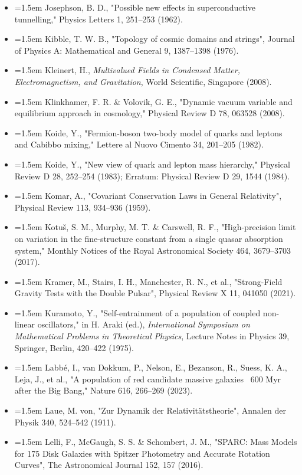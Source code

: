 \documentclass[11pt,a4paper]{article}
\begin{document}
\begin{itemize}[leftmargin=1.5em,label={}]
\item \hangindent=1.5em Josephson, B. D., "Possible new effects in superconductive tunnelling," Physics Letters 1, 251–253 (1962).
\item \hangindent=1.5em Kibble, T. W. B., "Topology of cosmic domains and strings", Journal of Physics A: Mathematical and General 9, 1387–1398 (1976).
\item \hangindent=1.5em Kleinert, H., \emph{Multivalued Fields in Condensed Matter, Electromagnetism, and Gravitation}, World Scientific, Singapore (2008).
\item \hangindent=1.5em Klinkhamer, F. R. \& Volovik, G. E., "Dynamic vacuum variable and equilibrium approach in cosmology," Physical Review D 78, 063528 (2008).
\item \hangindent=1.5em Koide, Y., "Fermion-boson two-body model of quarks and leptons and Cabibbo mixing," Lettere al Nuovo Cimento 34, 201–205 (1982).
\item \hangindent=1.5em Koide, Y., "New view of quark and lepton mass hierarchy," Physical Review D 28, 252–254 (1983); Erratum: Physical Review D 29, 1544 (1984).
\item \hangindent=1.5em Komar, A., "Covariant Conservation Laws in General Relativity", Physical Review 113, 934–936 (1959).
\item \hangindent=1.5em Kotuš, S. M., Murphy, M. T. \& Carswell, R. F., "High-precision limit on variation in the fine-structure constant from a single quasar absorption system," Monthly Notices of the Royal Astronomical Society 464, 3679–3703 (2017).
\item \hangindent=1.5em Kramer, M., Stairs, I. H., Manchester, R. N., et al., "Strong-Field Gravity Tests with the Double Pulsar", Physical Review X 11, 041050 (2021).
\item \hangindent=1.5em Kuramoto, Y., "Self-entrainment of a population of coupled non-linear oscillators," in H. Araki (ed.), \emph{International Symposium on Mathematical Problems in Theoretical Physics}, Lecture Notes in Physics 39, Springer, Berlin, 420–422 (1975).
\item \hangindent=1.5em Labbé, I., van Dokkum, P., Nelson, E., Bezanson, R., Suess, K. A., Leja, J., et al., "A population of red candidate massive galaxies ~600 Myr after the Big Bang," Nature 616, 266–269 (2023).
\item \hangindent=1.5em Laue, M. von, "Zur Dynamik der Relativitätstheorie", Annalen der Physik 340, 524–542 (1911).
\item \hangindent=1.5em Lelli, F., McGaugh, S. S. \& Schombert, J. M., "SPARC: Mass Models for 175 Disk Galaxies with Spitzer Photometry and Accurate Rotation Curves", The Astronomical Journal 152, 157 (2016).

\end{itemize}
\end{document}
